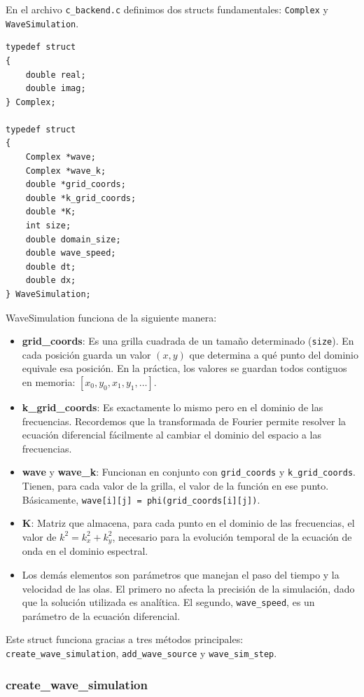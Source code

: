 \documentclass[a4paper]{article}
\begin{document}
En el archivo \texttt{c\_backend.c} definimos dos structs fundamentales: \texttt{Complex} y \texttt{WaveSimulation}.

\begin{verbatim}
typedef struct
{
    double real;
    double imag;
} Complex;

typedef struct
{
    Complex *wave;
    Complex *wave_k;
    double *grid_coords;
    double *k_grid_coords;
    double *K;
    int size;
    double domain_size;
    double wave_speed;
    double dt;
    double dx;
} WaveSimulation;
\end{verbatim}

WaveSimulation funciona de la siguiente manera:
\begin{itemize}
    \item \textbf{grid\_coords}: Es una grilla cuadrada de un tamaño determinado (\texttt{size}). En cada posición guarda un valor $(x, y)$ que determina a qué punto del dominio equivale esa posición. En la práctica, los valores se guardan todos contiguos en memoria: $[x_0, y_0, x_1, y_1, \ldots]$.
    \item \textbf{k\_grid\_coords}: Es exactamente lo mismo pero en el dominio de las frecuencias. Recordemos que la transformada de Fourier permite resolver la ecuación diferencial fácilmente al cambiar el dominio del espacio a las frecuencias.
    \item \textbf{wave} y \textbf{wave\_k}: Funcionan en conjunto con \texttt{grid\_coords} y \texttt{k\_grid\_coords}. Tienen, para cada valor de la grilla, el valor de la función en ese punto. Básicamente, \texttt{wave[i][j] = phi(grid\_coords[i][j])}.
    \item \textbf{K}: Matriz que almacena, para cada punto en el dominio de las frecuencias, el valor de $k^2 = k_x^2 + k_y^2$, necesario para la evolución temporal de la ecuación de onda en el dominio espectral.
    \item Los demás elementos son parámetros que manejan el paso del tiempo y la velocidad de las olas. El primero no afecta la precisión de la simulación, dado que la solución utilizada es analítica. El segundo, \texttt{wave\_speed}, es un parámetro de la ecuación diferencial.
\end{itemize}

Este struct funciona gracias a tres métodos principales: \texttt{create\_wave\_simulation}, \texttt{add\_wave\_source} y \texttt{wave\_sim\_step}.

\subsubsection{create\_wave\_simulation}
\end{document}
